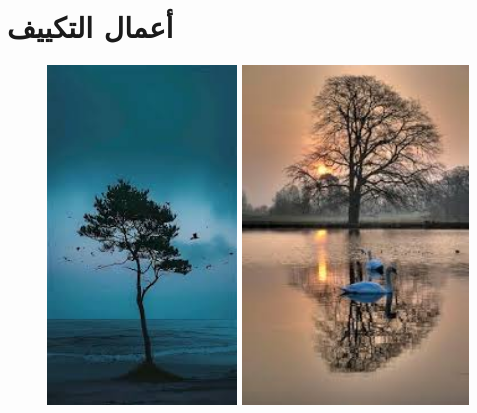 \documentclass{article}
\begin{document}
\section{أعمال التكييف}
\begin{figure}[H]
    \centering

    \begin{minipage}{0.45\textwidth}
        \centering
        \includegraphics[height=9cm,width=\textwidth]{hvac/1.jpg}
    \end{minipage}
    \hfill
    \begin{minipage}{0.45\textwidth}
        \centering
        \includegraphics[height=9cm,width=\textwidth]{hvac/2.jpg}
    \end{minipage}
    \vspace{0.5cm} %


\end{figure}
\end{document}
